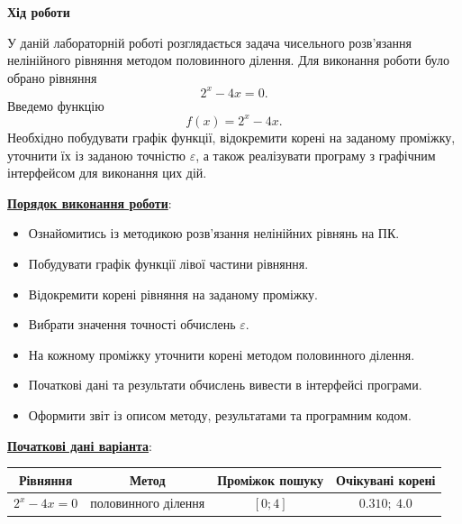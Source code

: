 \documentclass[12pt,a4paper]{article}
\begin{document}
    \begin{center} \textbf{\Large Хід роботи} \end{center}

    У даній лабораторній роботі розглядається задача чисельного розв'язання нелінійного рівняння
    методом половинного ділення. Для виконання роботи було обрано рівняння
    \[
        2^x - 4x = 0.
    \]
    Введемо функцію
    \[
        f(x) = 2^x - 4x.
    \]
    Необхідно побудувати графік функції, відокремити корені на заданому проміжку, уточнити їх із
    заданою точністю $\varepsilon$, а також реалізувати програму з графічним інтерфейсом для
    виконання цих дій.

    \vspace{1em}

    \noindent
    \textbf{\underline{Порядок виконання роботи}}:

    \begin{itemize}
        \item Ознайомитись із методикою розв'язання нелінійних рівнянь на ПК.
        \item Побудувати графік функції лівої частини рівняння.
        \item Відокремити корені рівняння на заданому проміжку.
        \item Вибрати значення точності обчислень $\varepsilon$.
        \item На кожному проміжку уточнити корені методом половинного ділення.
        \item Початкові дані та результати обчислень вивести в інтерфейсі програми.
        \item Оформити звіт із описом методу, результатами та програмним кодом.
    \end{itemize}

    \vspace{1em}

    \textbf{\underline{Початкові дані варіанта}}:

    \begin{center}
        \begin{tabular}{|c|c|c|c|}
            \hline
            Рівняння & Метод & Проміжок пошуку & Очікувані корені \\
            \hline
            $2^x - 4x = 0$ & половинного ділення & $[0;4]$ & $0.310;\ 4.0$ \\
            \hline
        \end{tabular}
    \end{center}
\end{document}
